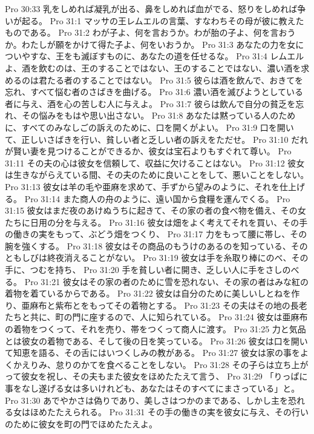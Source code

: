 Pro 30:33  乳をしめれば凝乳が出る、鼻をしめれば血がでる、怒りをしめれば争いが起る。
Pro 31:1  マッサの王レムエルの言葉、すなわちその母が彼に教えたものである。
Pro 31:2  わが子よ、何を言おうか。わが胎の子よ、何を言おうか。わたしが願をかけて得た子よ、何をいおうか。
Pro 31:3  あなたの力を女についやすな、王をも滅ぼすものに、あなたの道を任せるな。
Pro 31:4  レムエルよ、酒を飲むのは、王のすることではない、王のすることではない、濃い酒を求めるのは君たる者のすることではない。
Pro 31:5  彼らは酒を飲んで、おきてを忘れ、すべて悩む者のさばきを曲げる。
Pro 31:6  濃い酒を滅びようとしている者に与え、酒を心の苦しむ人に与えよ。
Pro 31:7  彼らは飲んで自分の貧乏を忘れ、その悩みをもはや思い出さない。
Pro 31:8  あなたは黙っている人のために、すべてのみなしごの訴えのために、口を開くがよい。
Pro 31:9  口を開いて、正しいさばきを行い、貧しい者と乏しい者の訴えをただせ。
Pro 31:10  だれが賢い妻を見つけることができるか、彼女は宝石よりもすぐれて尊い。
Pro 31:11  その夫の心は彼女を信頼して、収益に欠けることはない。
Pro 31:12  彼女は生きながらえている間、その夫のために良いことをして、悪いことをしない。
Pro 31:13  彼女は羊の毛や亜麻を求めて、手ずから望みのように、それを仕上げる。
Pro 31:14  また商人の舟のように、遠い国から食糧を運んでくる。
Pro 31:15  彼女はまだ夜のあけぬうちに起きて、その家の者の食べ物を備え、その女たちに日用の分を与える。
Pro 31:16  彼女は畑をよく考えてそれを買い、その手の働きの実をもって、ぶどう畑をつくり、
Pro 31:17  力をもって腰に帯し、その腕を強くする。
Pro 31:18  彼女はその商品のもうけのあるのを知っている、そのともしびは終夜消えることがない。
Pro 31:19  彼女は手を糸取り棒にのべ、その手に、つむを持ち、
Pro 31:20  手を貧しい者に開き、乏しい人に手をさしのべる。
Pro 31:21  彼女はその家の者のために雪を恐れない、その家の者はみな紅の着物を着ているからである。
Pro 31:22  彼女は自分のために美しいしとねを作り、亜麻布と紫布とをもってその着物とする。
Pro 31:23  その夫はその地の長老たちと共に、町の門に座するので、人に知られている。
Pro 31:24  彼女は亜麻布の着物をつくって、それを売り、帯をつくって商人に渡す。
Pro 31:25  力と気品とは彼女の着物である、そして後の日を笑っている。
Pro 31:26  彼女は口を開いて知恵を語る、その舌にはいつくしみの教がある。
Pro 31:27  彼女は家の事をよくかえりみ、怠りのかてを食べることをしない。
Pro 31:28  その子らは立ち上がって彼女を祝し、その夫もまた彼女をほめたたえて言う、
Pro 31:29  「りっぱに事をなし遂げる女は多いけれども、あなたはそのすべてにまさっている」と。
Pro 31:30  あでやかさは偽りであり、美しさはつかのまである、しかし主を恐れる女はほめたたえられる。
Pro 31:31  その手の働きの実を彼女に与え、その行いのために彼女を町の門でほめたたえよ。


